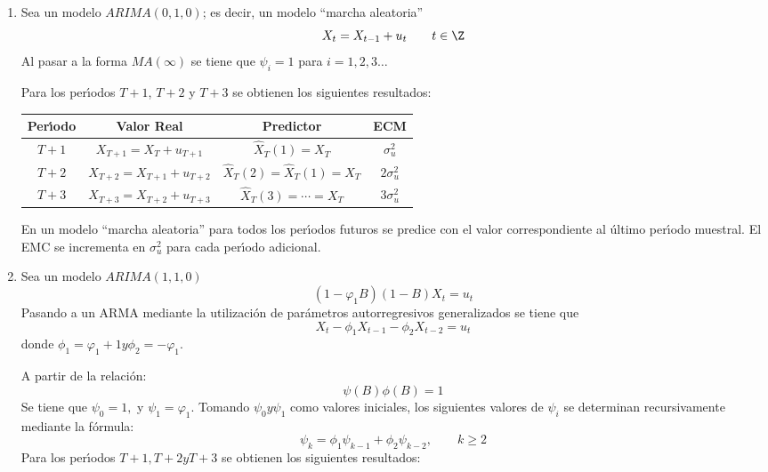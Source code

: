 \begin{ejemplo}
\begin{enumerate}
\item Sea un modelo $ARIMA (0, 1, 0)$; es decir, un modelo ``marcha aleatoria''
\[
X_{t} =X_{t-1} +u_{t} 
\qquad
t\in \Z
\]
Al pasar a la forma $MA( \infty )$ se tiene que $\psi_{i} =1$ 
para $i=1,2,3\ldots$

Para los per\'{\i}odos $T+1$, $T+2$ y $T+3$ se obtienen los siguientes 
resultados:


\begin{center}
\small
\begin{tabular}{@{}cccc@{}}
\toprule
\textbf{Per\'{\i}odo}& \textbf{Valor Real}& \textbf{Predictor}& \textbf{ECM} \\
\midrule
$T+1$& $X_{T+1} =X_{T} +u_{T+1} $& $\widehat{{X}}_{T} \left( 1 \right)=X_{T} $&
$\sigma_{u}^{2}$ \\[5pt]
$T+2$& $X_{T+2} =X_{T+1} +u_{T+2} $& $\widehat{{X}}_{T} \left( 2 \right)=\widehat{{X}}_{T} \left( 1 \right)=X_{T} $& $2\sigma_{u}^{2}$ \\[5pt]
$T+3$& $X_{T+3} =X_{T+2} +u_{T+3} $& $\widehat{{X}}_{T} \left( 3 \right)=\cdots =X_{T} $& $3\sigma_{u}^{2}$ \\
\bottomrule
\end{tabular}
\end{center}


En un modelo ``marcha aleatoria'' para todos los per\'{\i}odos futuros se 
predice con el valor correspondiente al \'{u}ltimo per\'{\i}odo muestral. El 
EMC se incrementa en $\sigma_{u}^{2}$ para cada per\'{\i}odo adicional.

\item Sea un modelo $ARIMA( {1,1,0} )$
\[
\left( {1-\varphi_{1} B} \right)\left( {1-B} \right)X_{t} =u_{t} 
\]
Pasando a un ARMA mediante la utilizaci\'{o}n de par\'{a}metros 
autorregresivos generalizados se tiene que
\[
X_{t} -\phi_{1} X_{t-1} -\phi_{2} X_{t-2} =u_{t} 
\]
donde $\phi_{1} =\varphi_{1} +1y\phi_{2} =-\varphi_{1} .$

A partir de la relaci\'{o}n:
\[
\psi \left( B \right)\phi \left( B \right)=1
\]
Se tiene que $\psi_{0} =1,$ y $\psi_{1} =\varphi_{1} .$ Tomando $\psi 
_{0} y\psi_{1} $ como valores iniciales, los siguientes valores de 
$\psi_{i} $ se determinan recursivamente mediante la f\'{o}rmula:
\[
\psi_{k} =\phi_{1} \psi_{k-1} +\phi_{2} \psi_{k-2} ,\qquad k\ge 2
\]
Para los per\'{\i}odos $T+1,T+2yT+3$ se obtienen los siguientes 
resultados:


\end{enumerate}
\end{ejemplo}
